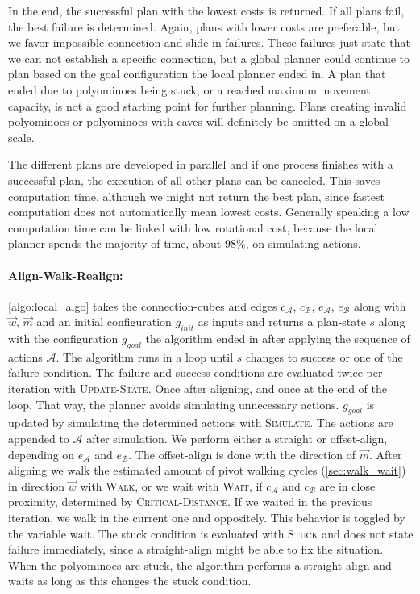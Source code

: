 In the end, the successful plan with the lowest costs is returned.
If all plans fail, the best failure is determined.
Again, plans with lower costs are preferable, but we favor impossible connection and slide-in failures.
These failures just state that we can not establish a specific connection, but a global planner could continue to plan based on the goal configuration the local planner ended in.
A plan that ended due to polyominoes being stuck, or a reached maximum movement capacity, is not a good starting point for further planning.
Plans creating invalid polyominoes or polyominoes with caves will definitely be omitted on a global scale.

The different plans are developed in parallel and if one process finishes with a successful plan, the execution of all other plans can be canceled.
This saves computation time, although we might not return the best plan, since fastest computation does not automatically mean lowest costs.
Generally speaking a low computation time can be linked with low rotational cost, because the local planner spends the majority of time, about $98\%$, on simulating actions.

\paragraph{Align-Walk-Realign:}

\autoref{algo:local_algo} takes the connection-cubes and edges $c_\mathcal{A}$, $c_\mathcal{B}$, $e_\mathcal{A}$, $e_\mathcal{B}$ along with $\vec{w}$, $\vec{m}$ and an initial configuration $g_\textit{init}$ as inputs and returns a plan-state $s$ along with the configuration $g_\textit{goal}$ the algorithm ended in after applying the sequence of actions $\mathcal{A}$.
The algorithm runs in a loop until $s$ changes to success or one of the failure condition.
The failure and success conditions are evaluated twice per iteration with {\scshape Update-State}.
Once after aligning, and once at the end of the loop.
That way, the planner avoids simulating unnecessary actions.
$g_\textit{goal}$ is updated by simulating the determined actions with {\scshape Simulate}.
The actions are appended to $\mathcal{A}$ after simulation.
We perform either a straight or offset-align, depending on $e_\mathcal{A}$ and $e_\mathcal{B}$.
The offset-align is done with the direction of $\vec{m}$.
After aligning we walk the estimated amount of pivot walking cycles (\autoref{sec:walk_wait}) in direction $\vec{w}$ with {\scshape Walk}, or we wait with {\scshape Wait}, if $c_\mathcal{A}$ and $c_\mathcal{B}$ are in close proximity, determined by {\scshape Critical-Distance}.
If we waited in the previous iteration, we walk in the current one and oppositely.
This behavior is toggled by the variable $\text{wait}$. 
The stuck condition is evaluated with {\scshape Stuck} and does not state failure immediately, since a straight-align might be able to fix the situation.
When the polyominoes are stuck, the algorithm performs a straight-align and waits as long as this changes the stuck condition.

